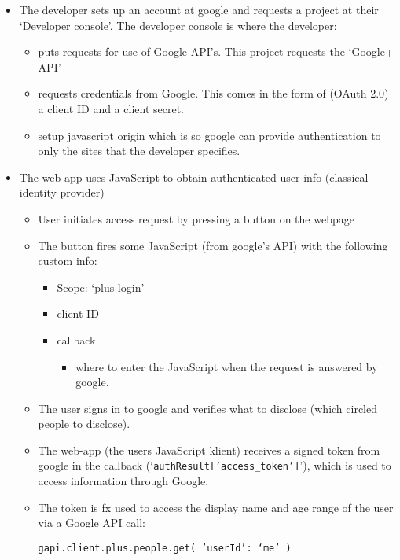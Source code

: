 \documentclass[12pt, a4paper]{article}
\begin{document}
\begin{itemize}
  \item The developer sets up an account at google and requests a
    project at their ‘Developer console’.
    The developer console is where the developer:
    \begin{itemize}
      \item puts requests for use of Google API’s.
        This project requests the ‘Google+ API’
      \item requests credentials from Google.
        This comes in the form of (OAuth 2.0) a client ID and a client
        secret.
      \item setup javascript origin which is so google can provide
        authentication to only the sites that the developer specifies.
    \end{itemize}
  \item The web app uses JavaScript to obtain authenticated user info
    (classical identity provider)
    \begin{itemize}
      \item User initiates access request by pressing a button on the webpage
      \item The button fires some JavaScript (from google’s API) with the following
        custom info:
        \begin{itemize}
          \item Scope: ‘plus-login’
          \item client ID
          \item callback
            \begin{itemize}
              \item where to enter the JavaScript when the request is answered by google.
            \end{itemize}
        \end{itemize}
      \item The user signs in to google and verifies what to disclose
        (which circled people to disclose).
      \item The web-app (the users JavaScript klient) receives a signed
        token from google in the callback
        (‘{\tt authResult['access\_token']}'), which is used to access
        information through Google.
      \item The token is fx used to access the display name and age
        range of the user via a Google API call:

        {\tt gapi.client.plus.people.get({ 'userId': ‘me' })}


\end{itemize}
\end{itemize}
\end{document}
